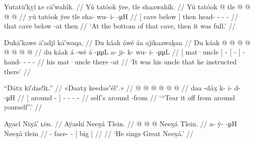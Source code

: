 \ex\label{ex:91-82-bottom-of-cave-full}%
%
\begingl
	\glpreamble	Yutatū′kỵî ʟe cā′wahîk. //
	\glpreamble	Yú tatóok ÿee, tle shaawahík. //
	\gla	{} Yú tatóok  @ {} {} tle
		 @ {} @ {} @ {} @ {} //
	\glb	{} yú tatóok ÿee {} {} tle
		sha- wu- i-  -μH //
	\glc	{}[  cave below \· {}] then
		head- - -  - //
	\gld	{} that cave below -at {} then
		 {} {} {} {} //
	\glft	‘At the bottom of that cave, then it was full.’
		//
\endgl
\xe

\ex\label{ex:91-83-he-instructed-his-uncle}%
%
\begingl
	\glpreamble	Dukā′kawe ā′adjî kā′waqa, //
	\glpreamble	Du káak áwé áa ajikaawaḵaa //
	\gla	{} Du káak {}  @ {} 
		{}  @ {} {}
		 @ {} @ {} @ {} @ {} @ {} @ {} //
	\glb	{} du káak {} á -wé
		{} á -μμL {}
		a- ji- k- wu- i-  -μμL //
	\glc	{}[  mat·uncle {}]  -
		{}[  - {}]
		- hand- - -  - //
	\gld	{} his mat·uncle {}  {}
		{} there -at {}
		 {} {} {} {} {} {} //
	\glft	‘It was his uncle that he instructed there’
		//
\endgl
\xe

\ex\label{ex:91-84-tear-off-around}%
%
\begingl
	\glpreamble	“Dātx kī′das!îʟ.” //
	\glpreamble	«\!Daatx̱ keedasʼélʼ.\!» //
	\gla	{} {}  @ {} {}
		 @ {} @ {} @ {} @ {} @ {} //
	\glb	{} {} daa -dáx̱ {}
		k- {} i- d-  -μH //
	\glc	{}[  around - {}]
		- \· - -  - //
	\gld	{} self’s around -from {}
		 {} {} {} {} {}  //
	\glft	‘“Tear it off from around yourself”.’
		//
\endgl
\xe


\ex\label{ex:91-85-sings-the-spirit}%
%
\begingl
	\glpreamble	Aỵacî Nix̣â′ ʟēn. //
	\glpreamble	Aÿashí Neex̱á Tlein. //
	\gla	{} @ {} @ {} @ {}
		{} Neex̱á Tlein. {} //
	\glb	a- ÿ-  -μH
		{} Neex̱á tlein {} //
	\glc	{}- face-  -
		{}[  big {}] //
	\gld	{} {} {} {} //
	\glft	‘He sings Great Neex̱á.’
		//
\endgl
\xe

